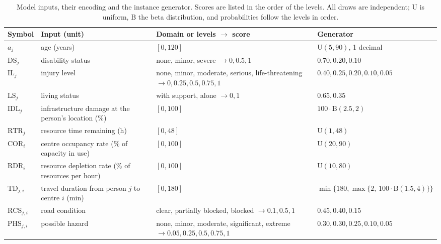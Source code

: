\begin{table}[H]
\centering
\caption{Model inputs, their encoding and the instance generator. Scores are listed in the
order of the levels. All draws are independent; $\mathrm{U}$ is uniform, $\mathrm{B}$ the beta
distribution, and probabilities follow the levels in order.\label{tab:inputs}}
\small
\begin{tabularx}{\textwidth}{@{}l>{\raggedright\arraybackslash}X>{\raggedright\arraybackslash}X>{\raggedright\arraybackslash}X@{}}
\toprule
Symbol & Input (unit) & Domain or levels $\to$ score & Generator\\
\midrule
$a_j$ & age (years) & $[0,120]$ & $\mathrm{U}(5,90)$, 1 decimal\\
$\mathrm{DS}_j$ & disability status & none, minor, severe $\to 0, 0.5, 1$ & $0.70, 0.20, 0.10$\\
$\mathrm{IL}_j$ & injury level & none, minor, moderate, serious, life-threatening $\to 0, 0.25, 0.5, 0.75, 1$ & $0.40, 0.25, 0.20, 0.10, 0.05$\\
$\mathrm{LS}_j$ & living status & with support, alone $\to 0, 1$ & $0.65, 0.35$\\
$\mathrm{IDL}_j$ & infrastructure damage at the person's location (\%) & $[0,100]$ & $100\cdot\mathrm{B}(2.5,2)$\\
$\mathrm{RTR}_j$ & resource time remaining (h) & $[0,48]$ & $\mathrm{U}(1,48)$\\
$\mathrm{COR}_i$ & centre occupancy rate (\% of capacity in use) & $[0,100]$ & $\mathrm{U}(20,90)$\\
$\mathrm{RDR}_i$ & resource depletion rate (\% of resources per hour) & $[0,100]$ & $\mathrm{U}(10,80)$\\
$\mathrm{TD}_{j,i}$ & travel duration from person $j$ to centre $i$ (min) & $[0,180]$ & $\min\{180,\max\{2,\,100\cdot\mathrm{B}(1.5,4)\}\}$\\
$\mathrm{RCS}_{j,i}$ & road condition & clear, partially blocked, blocked $\to 0.1, 0.5, 1$ & $0.45, 0.40, 0.15$\\
$\mathrm{PHS}_{j,i}$ & possible hazard & none, minor, moderate, significant, extreme $\to 0.05, 0.25, 0.5, 0.75, 1$ & $0.30, 0.30, 0.25, 0.10, 0.05$\\
\bottomrule
\end{tabularx}
\end{table}

